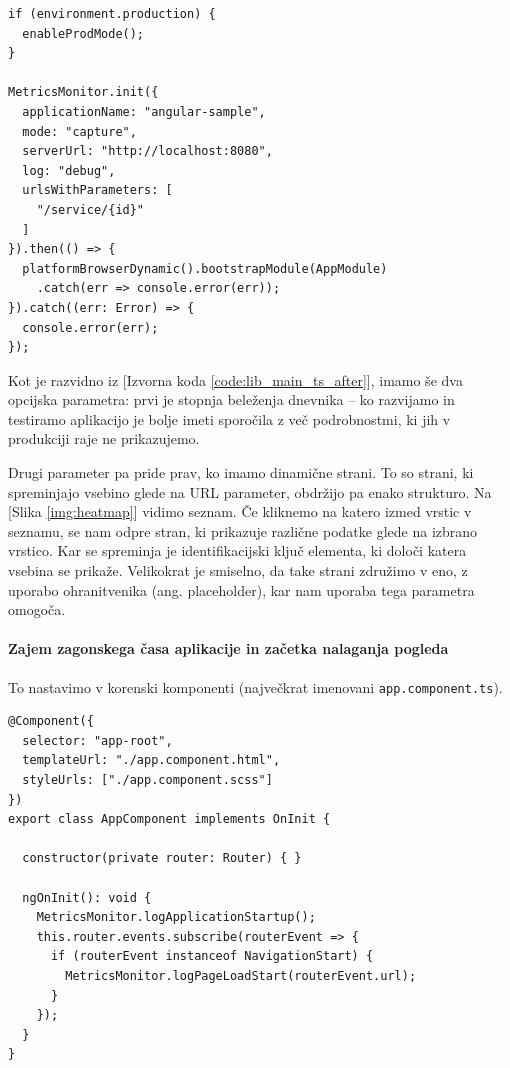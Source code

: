 \documentclass[a4paper, 12pt]{book}
\begin{document}
\begin{lstlisting}[label=code:lib_main_ts_after, caption=Inicializacija knjižnice]
if (environment.production) {
  enableProdMode();
}

MetricsMonitor.init({
  applicationName: "angular-sample",
  mode: "capture",
  serverUrl: "http://localhost:8080",
  log: "debug",
  urlsWithParameters: [
    "/service/{id}"
  ]
}).then(() => {
  platformBrowserDynamic().bootstrapModule(AppModule)
    .catch(err => console.error(err));
}).catch((err: Error) => {
  console.error(err);
});
\end{lstlisting}

Kot je razvidno iz [Izvorna koda \ref{code:lib_main_ts_after}], imamo še dva opcijska parametra: prvi je stopnja beleženja dnevnika -- ko razvijamo in testiramo aplikacijo je bolje imeti sporočila z več podrobnostmi, ki jih v produkciji raje ne prikazujemo.

Drugi parameter pa pride prav, ko imamo dinamične strani. To so strani, ki spreminjajo vsebino glede na URL parameter, obdržijo pa enako strukturo. Na [Slika \ref{img:heatmap}] vidimo seznam. Če kliknemo na katero izmed vrstic v seznamu, se nam odpre stran, ki prikazuje različne podatke glede na izbrano vrstico. Kar se spreminja je identifikacijski ključ elementa, ki določi katera vsebina se prikaže. Velikokrat je smiselno, da take strani združimo v eno, z uporabo ohranitvenika (ang. placeholder), kar nam uporaba tega parametra omogoča.

\paragraph{Zajem zagonskega časa aplikacije in začetka nalaganja pogleda}

To nastavimo v korenski komponenti (največkrat imenovani \verb|app.component.ts|).

\begin{lstlisting}[label=code:lib_app_comp, caption=Zajem zagonskega časa aplikacije in začetka nalaganja pogleda]
@Component({
  selector: "app-root",
  templateUrl: "./app.component.html",
  styleUrls: ["./app.component.scss"]
})
export class AppComponent implements OnInit {

  constructor(private router: Router) { }

  ngOnInit(): void {
    MetricsMonitor.logApplicationStartup();
    this.router.events.subscribe(routerEvent => {
      if (routerEvent instanceof NavigationStart) {
        MetricsMonitor.logPageLoadStart(routerEvent.url);
      }
    });
  }
}
\end{lstlisting}
\end{document}
